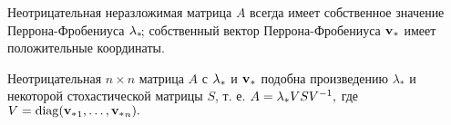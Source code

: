 \begin{ttt}
\label{T-Perr_Fro}
Неотрицательная неразложимая матрица $A$ всегда имеет собственное значение Перрона-Фробениуса ${\lambda_\ast}\!$; собственный вектор Перрона-Фробениуса ${\mathbf{v}_\ast}$ имеет положительные координаты.
\end{ttt}

\begin{col}
\label{NEOTR_V_STOCH}
Неотрицательная $n \times n$ матрица $A$ с ${\lambda_\ast}$ и ${\mathbf{v}_\ast}$ подобна произведению $\lambda_\ast$ и некоторой стохастической матрицы $S$, т. е. $A = {\lambda_\ast} VSV^{-1},$ где $V = \mathop{\rm diag}\nolimits({\mathbf{v}_\ast}_1, \ldots, {\mathbf{v}_\ast}_n).$
\end{col}
